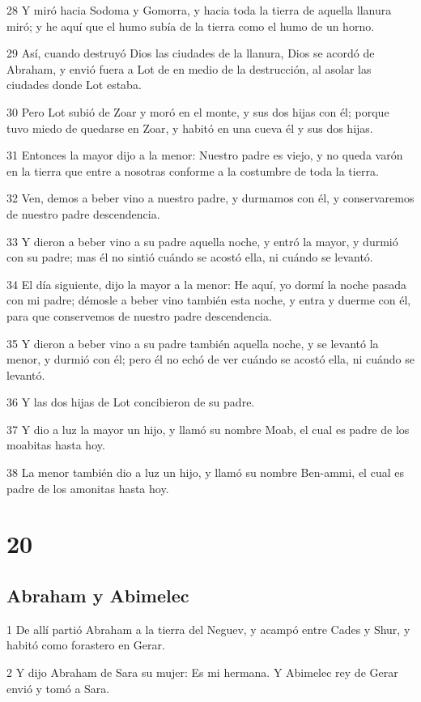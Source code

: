 28 Y miró hacia Sodoma y Gomorra, y hacia toda la tierra de aquella llanura miró; y he aquí que el humo subía de la tierra como el humo de un horno.

29 Así, cuando destruyó Dios las ciudades de la llanura, Dios se acordó de Abraham, y envió fuera a Lot de en medio de la destrucción, al asolar las ciudades donde Lot estaba.

30 Pero Lot subió de Zoar y moró en el monte, y sus dos hijas con él; porque tuvo miedo de quedarse en Zoar, y habitó en una cueva él y sus dos hijas.

31 Entonces la mayor dijo a la menor: Nuestro padre es viejo, y no queda varón en la tierra que entre a nosotras conforme a la costumbre de toda la tierra.

32 Ven, demos a beber vino a nuestro padre, y durmamos con él, y conservaremos de nuestro padre descendencia.

33 Y dieron a beber vino a su padre aquella noche, y entró la mayor, y durmió con su padre; mas él no sintió cuándo se acostó ella, ni cuándo se levantó.

34 El día siguiente, dijo la mayor a la menor: He aquí, yo dormí la noche pasada con mi padre; démosle a beber vino también esta noche, y entra y duerme con él, para que conservemos de nuestro padre descendencia.

35 Y dieron a beber vino a su padre también aquella noche, y se levantó la menor, y durmió con él; pero él no echó de ver cuándo se acostó ella, ni cuándo se levantó.

36 Y las dos hijas de Lot concibieron de su padre.

37 Y dio a luz la mayor un hijo, y llamó su nombre Moab, el cual es padre de los moabitas hasta hoy.

38 La menor también dio a luz un hijo, y llamó su nombre Ben-ammi, el cual es padre de los amonitas hasta hoy.

\chapter{20}

\section{Abraham y Abimelec}

1 De allí partió Abraham a la tierra del Neguev, y acampó entre Cades y Shur, y habitó como forastero en Gerar.

2 Y dijo Abraham de Sara su mujer: Es mi hermana. Y Abimelec rey de Gerar envió y tomó a Sara.

